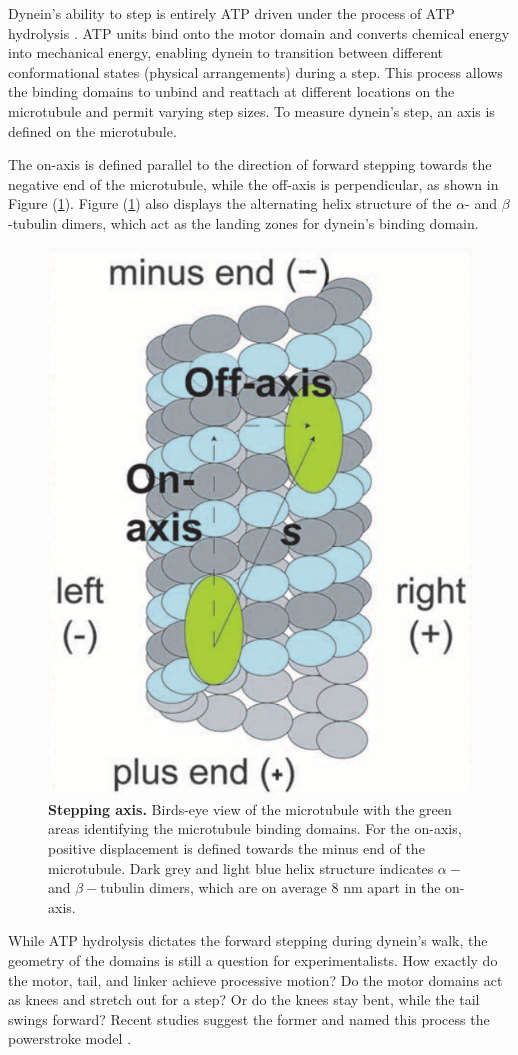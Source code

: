 Dynein's ability to step is entirely ATP driven under the process of ATP hydrolysis \cite{manna2020mechanistic, elshenawy2020lis1}. ATP units bind onto the motor domain and converts chemical energy into mechanical energy, enabling dynein to transition between different conformational states (physical arrangements) during a step. This process allows the binding domains to unbind and reattach at different locations on the microtubule and permit varying step sizes. To measure dynein's step, an axis is defined on the microtubule.

The on-axis is defined parallel to the direction of forward stepping towards the negative end of the microtubule, while the off-axis is perpendicular, as shown in Figure (\ref{fig:axis}). Figure (\ref{fig:axis}) also displays the alternating helix structure of the $\alpha$- and $\beta$-tubulin dimers, which act as the landing zones for dynein's binding domain.  

\begin{figure}[H]
	\centering
	\includegraphics[width=0.3\columnwidth]{Figures/Onaxis.png}
	\caption[Stepping Axis]{\textbf{Stepping axis.} Birds-eye view of the microtubule with the green areas identifying the microtubule binding domains. For the on-axis, positive displacement is defined towards the minus end of the microtubule. Dark grey and light blue helix structure indicates $\alpha-$ and $\beta-$tubulin dimers, which are on average 8 nm apart in the on-axis. \cite{Dewitt2012} }
	\label{fig:axis}
\end{figure}

While ATP hydrolysis dictates the forward stepping during dynein's walk, the geometry of the domains is still a question for experimentalists. How exactly do the motor, tail, and linker achieve processive motion? Do the motor domains act as knees and stretch out for a step? Or do the knees stay bent, while the tail swings forward? Recent studies suggest the former and named this process the powerstroke model \cite{Burgess2003}. 

